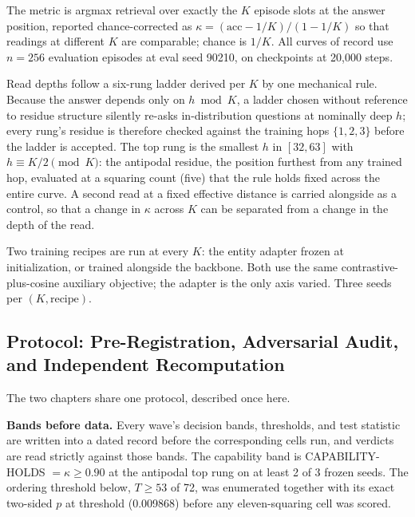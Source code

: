 The metric is argmax retrieval over exactly the $K$ episode slots at the
answer position, reported chance-corrected as
$\kappa = (\mathrm{acc} - 1/K)/(1 - 1/K)$ so that readings at different
$K$ are comparable; chance is $1/K$. All curves of record use $n=256$
evaluation episodes at eval seed 90210, on checkpoints at 20,000 steps.

Read depths follow a six-rung ladder derived per $K$ by one mechanical
rule. Because the answer depends only on $h \bmod K$, a ladder chosen
without reference to residue structure silently re-asks in-distribution
questions at nominally deep $h$; every rung's residue is therefore
checked against the training hops $\{1,2,3\}$ before the ladder is
accepted. The top rung is the smallest $h$ in $[32,63]$ with
$h \equiv K/2 \pmod K$: the antipodal residue, the position furthest
from any trained hop, evaluated at a squaring count (five) that the rule
holds fixed across the entire curve. A second read at a fixed effective
distance is carried alongside as a control, so that a change in $\kappa$
across $K$ can be separated from a change in the depth of the read.

Two training recipes are run at every $K$: the entity adapter frozen at
initialization, or trained alongside the backbone. Both use the same
contrastive-plus-cosine auxiliary objective; the adapter is the only
axis varied. Three seeds per $(K, \mathrm{recipe})$.

\subsection{Protocol: Pre-Registration, Adversarial Audit, and Independent Recomputation}

The two chapters share one protocol, described once here.

\textbf{Bands before data.} Every wave's decision bands, thresholds, and test
statistic are written into a dated record before the corresponding cells
run, and verdicts are read strictly against those bands. The capability
band is CAPABILITY-HOLDS $= \kappa \geq 0.90$ at the antipodal top rung
on at least 2 of 3 frozen seeds. The ordering threshold below,
$T \geq 53$ of 72, was enumerated together with its exact two-sided $p$
at threshold (0.009868) before any eleven-squaring cell was scored.

